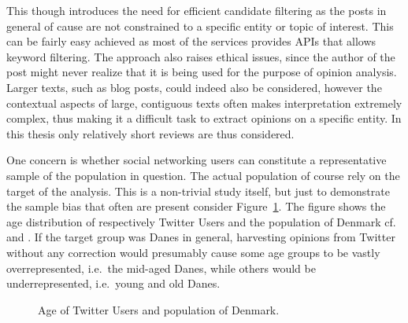 This though introduces the need for efficient candidate filtering as the posts in general of cause are not constrained to a specific entity or topic of interest. This can be fairly easy achieved as most of the services provides APIs that allows keyword filtering.
The approach also raises ethical issues, since the author of the post might never realize that it is being used for the purpose of opinion analysis. Larger texts, such as blog posts, could indeed also be considered, however the contextual aspects of large, contiguous texts often makes interpretation extremely complex, thus making it a difficult task to extract opinions on a specific entity. In this thesis only relatively short reviews are thus considered.

One concern is whether social networking users can constitute a representative sample of the population in question. The actual population of course rely on the target of the analysis. This is a non-trivial study itself, but just to demonstrate the sample bias that  often are present consider Figure~\ref{fig:population}. The figure shows the age distribution of respectively Twitter Users and the population of Denmark cf.\ \cite{pingdom} and \cite{euroStat}. If the target group was Danes in general, harvesting opinions from Twitter without any correction would presumably cause some age groups to be vastly overrepresented, i.e.\ the mid-aged Danes, while others would be underrepresented, i.e.\ young and old Danes. 
\begin{figure}[ht]
\begin{center}
\end{center}
\vspace{-1em}
\caption{Age of Twitter Users and population of Denmark.}
\label{fig:population}
\end{figure}

